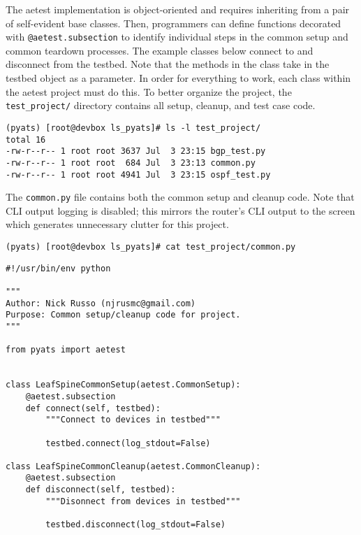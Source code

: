 The aetest implementation is object-oriented and requires inheriting from a
pair of self-evident base classes. Then, programmers can define functions
decorated with \verb|@aetest.subsection| to identify individual steps in the
common setup and common teardown processes. The example classes below
connect to and disconnect from the testbed. Note that the methods in the
class take in the testbed object as a parameter. In order for everything to
work, each class within the aetest project must do this. To better
organize the project, the \verb|test_project/| directory contains all setup,
cleanup, and test case code.

\begin{verbatim}
(pyats) [root@devbox ls_pyats]# ls -l test_project/
total 16
-rw-r--r-- 1 root root 3637 Jul  3 23:15 bgp_test.py
-rw-r--r-- 1 root root  684 Jul  3 23:13 common.py
-rw-r--r-- 1 root root 4941 Jul  3 23:15 ospf_test.py
\end{verbatim}

The \verb|common.py| file contains both the common setup and cleanup code.
Note that CLI output logging is disabled; this mirrors the router's CLI
output to the screen which generates unnecessary clutter for this project.

\begin{verbatim}
(pyats) [root@devbox ls_pyats]# cat test_project/common.py
\end{verbatim}

\begin{verbatim}
#!/usr/bin/env python

"""
Author: Nick Russo (njrusmc@gmail.com)
Purpose: Common setup/cleanup code for project.
"""

from pyats import aetest


class LeafSpineCommonSetup(aetest.CommonSetup):
    @aetest.subsection
    def connect(self, testbed):
        """Connect to devices in testbed"""

        testbed.connect(log_stdout=False)

class LeafSpineCommonCleanup(aetest.CommonCleanup):
    @aetest.subsection
    def disconnect(self, testbed):
        """Disonnect from devices in testbed"""

        testbed.disconnect(log_stdout=False)
\end{verbatim}

